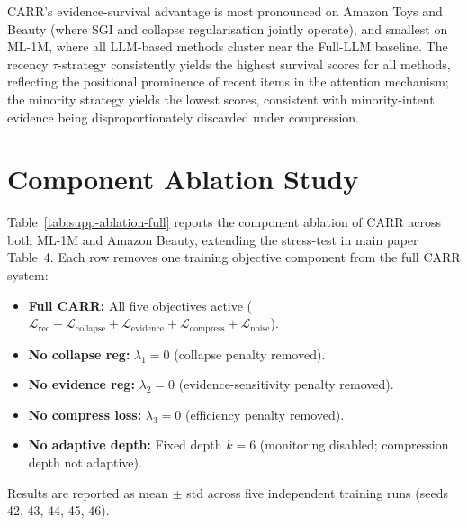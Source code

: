 \documentclass[letterpaper,10pt]{article}
\begin{document}
CARR's evidence-survival advantage is most pronounced on Amazon Toys and Beauty (where SGI and collapse regularisation jointly operate), and smallest on ML-1M, where all LLM-based methods cluster near the Full-LLM baseline. The recency $\tau$-strategy consistently yields the highest survival scores for all methods, reflecting the positional prominence of recent items in the attention mechanism; the minority strategy yields the lowest scores, consistent with minority-intent evidence being disproportionately discarded under compression.

\section{Component Ablation Study}
\label{sec:supp-ablation}

Table~\ref{tab:supp-ablation-full} reports the component ablation of CARR across both ML-1M and Amazon Beauty, extending the stress-test in main paper Table~4. Each row removes one training objective component from the full CARR system:

\begin{itemize}
  \item \textbf{Full CARR:} All five objectives active ($\mathcal{L}_{\mathrm{rec}} + \mathcal{L}_{\mathrm{collapse}} + \mathcal{L}_{\mathrm{evidence}} + \mathcal{L}_{\mathrm{compress}} + \mathcal{L}_{\mathrm{noise}}$).
  \item \textbf{No collapse reg:} $\lambda_1 = 0$ (collapse penalty removed).
  \item \textbf{No evidence reg:} $\lambda_2 = 0$ (evidence-sensitivity penalty removed).
  \item \textbf{No compress loss:} $\lambda_3 = 0$ (efficiency penalty removed).
  \item \textbf{No adaptive depth:} Fixed depth $k=6$ (monitoring disabled; compression depth not adaptive).
\end{itemize}

Results are reported as mean $\pm$ std across five independent training runs (seeds 42, 43, 44, 45, 46).
\end{document}
